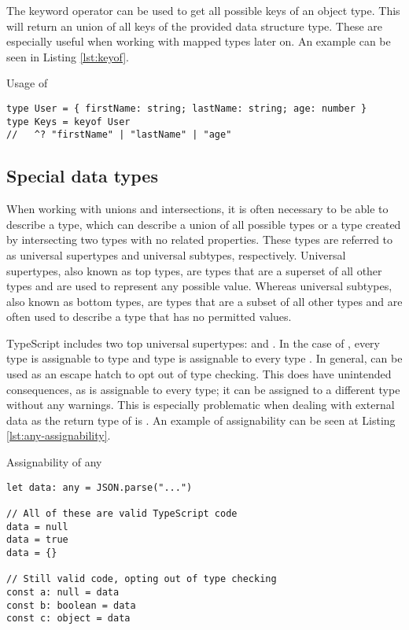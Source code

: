 The  keyword operator can be used to get all possible keys of an object type. This will return an union of all keys of the provided data structure type. These are especially useful when working with mapped types later on. An example can be seen in Listing \ref{lst:keyof}.

\begin{listing}[ht]
  \caption{Usage of }\label{lst:keyof}
  \begin{verbatim}
type User = { firstName: string; lastName: string; age: number }
type Keys = keyof User
//   ^? "firstName" | "lastName" | "age"
\end{verbatim}
\end{listing}

\subsection{Special data types}

When working with unions and intersections, it is often necessary to be able to describe a type, which can describe a union of all possible types or a type created by intersecting two types with no related properties. These types are referred to as universal supertypes and universal subtypes, respectively. Universal supertypes, also known as top types, are types that are a superset of all other types and are used to represent any possible value. Whereas universal subtypes, also known as bottom types, are types that are a subset of all other types and are often used to describe a type that has no permitted values.

TypeScript includes two top universal supertypes:  and . In the case of , every type is assignable to type  and type  is assignable to every type \cite{TopTypesAny}. In general,  can be used as an escape hatch to opt out of type checking. This does have unintended consequences, as  is assignable to every type; it can be assigned to a different type without any warnings. This is especially problematic when dealing with external data as the return type of  is . An example of assignability can be seen at Listing \ref{lst:any-assignability}.

\begin{listing}[ht]
  \caption{Assignability of any}\label{lst:any-assignability}
  \begin{verbatim}
let data: any = JSON.parse("...") 

// All of these are valid TypeScript code
data = null
data = true
data = {}

// Still valid code, opting out of type checking
const a: null = data
const b: boolean = data
const c: object = data
  \end{verbatim}
\end{listing}

